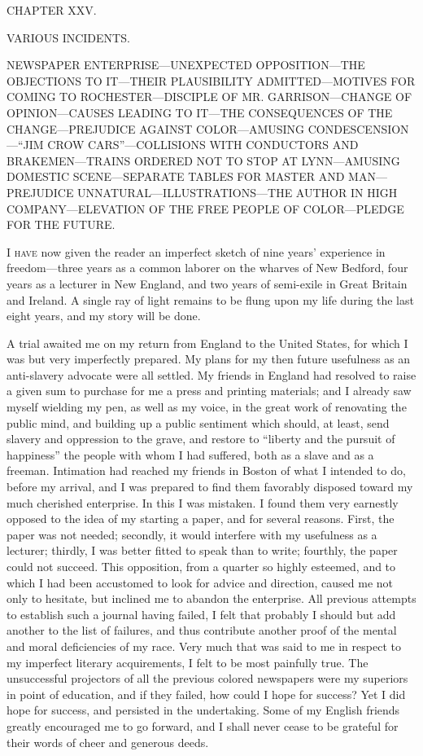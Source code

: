{}

{CHAPTER XXV.}

VARIOUS INCIDENTS.

{NEWSPAPER ENTERPRISE---UNEXPECTED OPPOSITION---THE OBJECTIONS TO
IT---THEIR PLAUSIBILITY ADMITTED---MOTIVES FOR COMING TO
ROCHESTER---DISCIPLE OF MR. GARRISON---CHANGE OF OPINION---CAUSES
LEADING TO IT---THE CONSEQUENCES OF THE CHANGE---PREJUDICE AGAINST
COLOR---AMUSING CONDESCENSION---``JIM CROW CARS''---COLLISIONS WITH
CONDUCTORS AND BRAKEMEN---TRAINS ORDERED NOT TO STOP AT LYNN---AMUSING
DOMESTIC SCENE---SEPARATE TABLES FOR MASTER AND MAN---PREJUDICE
UNNATURAL---ILLUSTRATIONS---THE AUTHOR IN HIGH COMPANY---ELEVATION OF
THE FREE PEOPLE OF COLOR---PLEDGE FOR THE FUTURE.}

\textsc{I have} now given the reader an imperfect sketch of nine years'
experience in freedom---three years as a common laborer on the wharves
of New Bedford, four years as a lecturer in New England, and two years
of semi-exile in Great Britain and Ireland. A single ray of light
remains to be flung upon my life during the last eight years, and my
story will be done.

A trial awaited me on my return from England to the United States, for
which I was but very imperfectly prepared. My plans for my then future
usefulness as an anti-slavery advocate were all settled. My friends in
England had resolved to raise a given sum to purchase for me a press and
printing materials; and I already saw myself wielding my pen, as well as
my voice, in the great work of renovating the public mind, and building
up a public sentiment {}which should, at least, send slavery and
oppression to the grave, and restore to ``liberty and the pursuit of
happiness'' the people with whom I had suffered, both as a slave and as
a freeman. Intimation had reached my friends in Boston of what I
intended to do, before my arrival, and I was prepared to find them
favorably disposed toward my much cherished enterprise. In this I was
mistaken. I found them very earnestly opposed to the idea of my starting
a paper, and for several reasons. First, the paper was not needed;
secondly, it would interfere with my usefulness as a lecturer; thirdly,
I was better fitted to speak than to write; fourthly, the paper could
not succeed. This opposition, from a quarter so highly esteemed, and to
which I had been accustomed to look for advice and direction, caused me
not only to hesitate, but inclined me to abandon the enterprise. All
previous attempts to establish such a journal having failed, I felt that
probably I should but add another to the list of failures, and thus
contribute another proof of the mental and moral deficiencies of my
race. Very much that was said to me in respect to my imperfect literary
acquirements, I felt to be most painfully true. The unsuccessful
projectors of all the previous colored newspapers were my superiors in
point of education, and if they failed, how could I hope for success?
Yet I did hope for success, and persisted in the undertaking. Some of my
English friends greatly encouraged me to go forward, and I shall never
cease to be grateful for their words of cheer and generous deeds.

